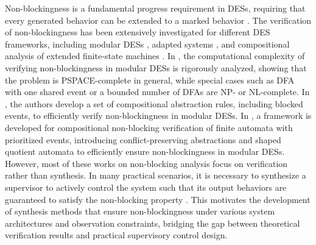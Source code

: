 \documentclass[final,5p,times,twocolumn,authoryear]{elsarticle}
\begin{document}
Non-blockingness is a fundamental progress requirement in DESs, requiring that every generated behavior can be extended to a marked behavior \cite{chen1991dealing}.
%
The verification of non-blockingness has been extensively investigated for different DES frameworks, including modular DESs \cite{tang2024compositional}, adapted systems \cite{thuijsman2024transformational}, and compositional analysis of extended finite-state machines \cite{mohajerani2016framework}.
%
In \cite{tomas2018complexity}, the computational complexity of verifying non-blockingness in modular DESs is rigorously analyzed, showing that the problem is PSPACE-complete in general, while special cases such as DFA with one shared event or a bounded number of DFAs are NP- or NL-complete.
%
In \cite{pilbrow2015algorithm}, the authors develop a set of compositional abstraction rules, including blocked events, to efficiently verify non-blockingness in modular DESs.
%
In \cite{tang2024compositional}, a framework is developed for compositional non-blocking verification of finite automata with prioritized events, introducing conflict-preserving abstractions and shaped quotient automata to efficiently ensure non-blockingness in modular DESs.
%
However, most of these works on non-blocking analysis focus on verification rather than synthesis. In many practical scenarios, it is necessary to synthesize a supervisor to actively control the system such that its output behaviors are guaranteed to satisfy the non-blocking property \cite{chen1991dealing, malik2013compositional}. 
This motivates the development of synthesis methods that ensure non-blockingness under various system architectures and observation constraints, bridging the gap between theoretical verification results and practical supervisory control design.
\end{document}

